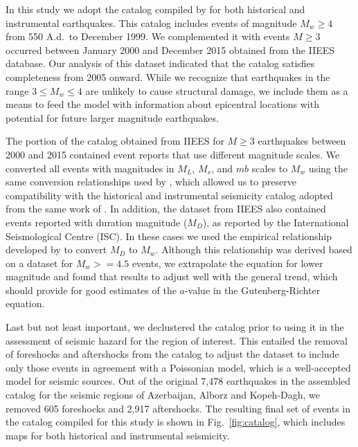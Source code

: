 In this study we adopt the catalog compiled by \citet{Zare2014} for both historical and instrumental earthquakes. This catalog includes events of magnitude $M_w \geq 4$ from 550 A.d.~to December 1999. We complemented it with events $M \geq 3$ occurred between January 2000 and December 2015 obtained from the IIEES database. Our analysis of this dataset indicated that the catalog satisfies completeness from 2005 onward. While we recognize that earthquakes in the range $3 \leq M_w \leq 4$ are unlikely to cause structural damage, we include them as a means to feed the model with information about epicentral locations with potential for future larger magnitude earthquakes. 

The portion of the catalog obtained from IIEES for $M \geq 3$ earthquakes between 2000 and 2015 contained event reports that use different magnitude scales. We converted all events with magnitudes in $M_L$, $M_s$, and $mb$ scales to $M_w$ using the same conversion relationships used by \citet{Zare2014}, which allowed us to preserve compatibility with the historical and instrumental seismicity catalog adopted from the same work of \citet{Zare2014}. In addition, the dataset from IIEES also contained events reported with duration magnitude ($M_D$), as reported by the International Seismological Centre (ISC). In these cases we used the empirical relationship developed by \citet{Deniz2010} to convert $M_D$ to $M_w$. Although this relationship was derived based on a dataset for $M_w>=4.5$ events, we extrapolate the equation for lower magnitude and found that results to adjust well with the general trend, which should provide for good estimates of the $a$-value in the Gutenberg-Richter equation.

Last but not least important, we declustered the catalog prior to using it in the assessment of seismic hazard for the region of interest. This entailed the removal of foreshocks and aftershocks from the catalog to adjust the dataset to include only those events in agreement with a Poissonian model, which is a well-accepted model for seismic sources. Out of the original 7,478 earthquakes in the assembled catalog for the seismic regions of Azerbaijan, Alborz and Kopeh-Dagh, we removed 605 foreshocks and 2,917 aftershocks. The resulting final set of events in the catalog compiled for this study is shown in Fig.~\ref{fig:catalog}, which includes maps for both historical and instrumental seismicity.

